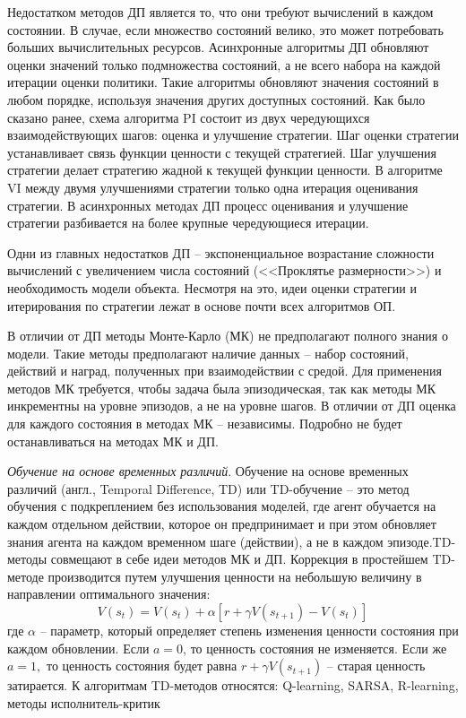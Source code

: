 Недостатком методов ДП является то, что они требуют вычислений в каждом состоянии. В случае, если множество состояний велико, это может потребовать больших вычислительных ресурсов.
Асинхронные алгоритмы ДП обновляют оценки значений только подмножества состояний, а не всего набора на каждой итерации оценки политики. Такие алгоритмы обновляют значения состояний в любом порядке, используя значения других доступных состояний.
Как было сказано ранее, схема алгоритма PI состоит из двух чередующихся взаимодействующих шагов: оценка и улучшение стратегии. Шаг оценки стратегии устанавливает связь функции ценности с текущей стратегией. Шаг улучшения стратегии делает стратегию жадной к текущей функции ценности. В алгоритме VI между двумя улучшениями стратегии только одна итерация оценивания стратегии. В асинхронных методах ДП процесс оценивания и улучшение стратегии разбивается на более крупные чередующиеся итерации.

Одни из главных недостатков ДП -- экспоненциальное возрастание сложности вычислений с увеличением числа состояний (<<Проклятье размерности>>) и необходимость модели объекта. Несмотря на это, идеи оценки стратегии и итерирования по стратегии лежат в основе почти всех алгоритмов ОП.

В отличии от ДП методы Монте-Карло (МК) не предполагают полного знания о модели. Такие методы предполагают наличие данных -- набор состояний, действий и наград, полученных при взаимодействии с средой. Для применения методов МК требуется, чтобы задача была эпизодическая, так как методы МК инкрементны на уровне эпизодов, а не на уровне шагов. В отличии от ДП оценка для каждого состояния в методах МК -- независимы.
Подробно не будет останавливаться на методах МК и ДП.
%
%

\textit{Обучение на основе временных различий}.
Обучение на основе временных различий (англ., Temporal Difference, TD) или TD-обучение -- это метод обучения с подкреплением без использования моделей, где агент обучается на каждом отдельном действии, которое он предпринимает и при этом обновляет знания агента на каждом временном шаге (действии), а не в каждом эпизоде.TD-методы совмещают в себе идеи методов МК и ДП. Коррекция в простейшем TD-методе производится путем улучшения ценности на небольшую величину в направлении оптимального значения:
\begin{equation*}
\label{td_function}
V(s_t) = V(s_t) + \alpha[r + \gamma V(s_{t+1}) - V(s_t)]
\end{equation*}
где $\alpha$ -- параметр, который определяет степень изменения ценности состояния при каждом обновлении. Если $a = 0$, то ценность состояния не изменяется. Если же $a = 1,$ то ценность состояния будет равна $r + \gamma V(s_{t+1})$ -- старая ценность затирается. К алгоритмам TD-методов относятся: Q-learning, SARSA, R-learning, методы исполнитель-критик

